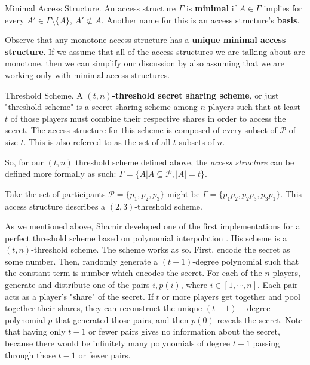 \theoremstyle{definition}
\begin{definition}{Minimal Access Structure.}
    \label{defn:minimal}
    An access structure $\Gamma$ is \textbf{minimal} if $A \in \Gamma$ implies for every $A' \in \Gamma \setminus \{A\}$, $A' \not\subset A$. Another name for this is an access structure's \textbf{basis}.
\end{definition}

Observe that any monotone access structure has a \textbf{unique minimal access structure}. If we assume that all of the access structures we are talking about are monotone, then we can simplify our discussion by also assuming that we are working only with minimal access structures.

\theoremstyle{definition}
\begin{definition}{Threshold Scheme.}
    \label{defn:threshold-scheme}
    A \textbf{$(t,n)$-threshold secret sharing scheme}, or just "threshold scheme" is a secret sharing scheme among $n$ players such that at least $t$ of those players must combine their respective shares in order to access the secret. The access structure for this scheme is composed of every subset of $\mathcal{P}$ of size $t$. This is also referred to as the set of all $t$-subsets of $n$.
\end{definition}

So, for our $(t,n)$ threshold scheme defined above, the \textit{access structure} can be defined more formally as such: $\Gamma = \{A | A \subseteq \mathcal{P} , |A| = t\}$.

\begin{example}
    Take the set of participants $\mathcal{P} = \{p_1,p_2,p_3\}$ might be $\Gamma = \{p_1p_2,p_2p_3,p_3p_1\}$. This access structure describes a $(2,3)$-threshold scheme.
\end{example}

As we mentioned above, Shamir developed one of the first implementations for a perfect threshold scheme based on polynomial interpolation \cite{shamir}. His scheme is a $(t,n)$-threshold scheme. The scheme works as so. First, encode the secret as some number. Then, randomly generate a $(t-1)$-degree polynomial such that the constant term is number which encodes the secret. For each of the $n$ players, generate and distribute one of the pairs $i, p(i)$, where $i \in [1, \cdots, n]$. Each pair acts as a player's "share" of the secret. If $t$ or more players get together and pool together their shares, they can reconstruct the unique $(t-1)-$degree polynomial $p$ that generated those pairs, and then $p(0)$ reveals the secret. Note that having only $t-1$ or fewer pairs gives no information about the secret, because there would be infinitely many polynomials of degree $t-1$ passing through those $t-1$ or fewer pairs.

